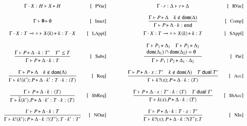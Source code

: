 \[
	\begin{array}{crccr}
		\Gamma \cat X:H \proves X \hastype H & \trule{PVar}
		&\qquad&
		\Gamma \cat r:\Delta \proves r \hastype \Delta & \trule{RVar}
		\\[4mm]

		\Gtprocess{\inact}{\es} & \trule{Inact}
		&\qquad&
		\tree{
			\Gtprocess{P}{\Delta} \quad k \notin \dom{\Delta}
		}{
			\Gtprocess{P}{\Delta \cat k:\tinact}
		} & \trule{Comp}
		\\[4mm]

		\tprocess{\Gamma \cat \X: \lhot{T}}{\appl{X}{k}}{k:T \cat X} & \trule{LAppl}
		& &
		\tprocess{\Gamma \cat \X: \shot{T}}{\appl{X}{k}}{k:T} & \trule{SAppl}
		\\[4mm]

		\tree{
			\Gtprocess{P}{\Delta \cat k: T'} \quad T' \subt T
		}{
			\Gtprocess{P}{\Delta \cat k: T}
		} & \trule{Subs}
		& &
		\tree{
			\begin{array}{l}
				\Gtprocess{P_1}{\Delta_1} \quad \Gtprocess{P_2}{\Delta_2} \\
				\dom{\Delta_1} \cap \dom{\Delta_2} = \es
			\end{array}
		}{
			\Gtprocess{P_1 \Par P_2}{\Delta_1 \cat \Delta_2}
		} & \trule{Par}
		\\[7mm]

		\tree{
			\Gamma \proves P \hastype \Delta \quad k \notin \dom{\Delta}
		}{
			\Gamma \proves \bout{k}{k'} P \hastype \Delta \cat k':T \cat k:\chtype{T}
		} & \trule{Req}
		&\quad&
		\tree{
			\Gamma \proves P \hastype \Delta \cat x: T' \quad k \notin \dom{\Delta} \quad T \dualof T'
		}{
			\Gamma \proves \binp{k}{x} P \hastype \Delta \cat k: \chtype{T}
		} & \trule{Acc}
		\\[7mm]

		\tree{
			\Gamma \proves P \hastype \Delta \cat k:\chtype{T}
		}{
			\Gamma \proves \breq{k}{k'} P \hastype \Delta \cat k':T \cat k:\chtype{T}
		} & \trule{ShReq}
		&\quad&
		\tree{
			\Gamma \proves P \hastype \Delta \cat x: T' \cat k:\chtype{T} \quad T \dualof T'
		}{
			\Gamma \proves \bacc{k}{x} P \hastype \Delta \cat k: \chtype{T}
		} & \trule{ShAcc}
		\\[7mm]

		\tree{
			\Gamma \proves P \hastype \Delta \cat k: T
		}{
			\Gamma \proves \bout{k}{k'} P \hastype \Delta \cat k:\btout{T'} T \cat k':T'
		} & \trule{NOut}
		&\quad&
		\tree{
			\Gamma \proves P \hastype \Delta \cat k: T \cat x: T'
		}{
			\Gamma \proves \binp{k}{x} P \hastype \Delta \cat k: \btinp{T'} T
		} & \trule{NIn}
		\\[7mm]


\end{array}\]

